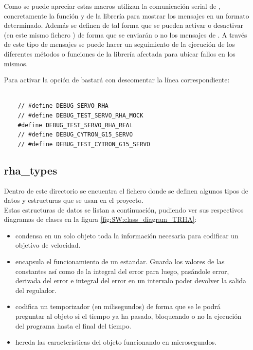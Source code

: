         Como se puede apreciar estas macros utilizan la comunicación serial de , concretamente la función  y  de la librería  para mostrar los mensajes en un formato determinado. Además se definen de tal forma que se pueden activar o desactivar (en este mismo fichero ) de forma que se enviarán o no los mensajes de . A través de este tipo de mensajes se puede hacer un seguimiento de la ejecución de los diferentes métodos o funciones de la librería afectada para ubicar fallos en los mismos.

        Para activar la opción de  bastará con descomentar la línea correspondiente:

        \lstset{language=C, breaklines=true, basicstyle=\footnotesize}
        \begin{lstlisting}[frame=single]

    // #define DEBUG_SERVO_RHA
    // #define DEBUG_TEST_SERVO_RHA_MOCK
    #define DEBUG_TEST_SERVO_RHA_REAL
    // #define DEBUG_CYTRON_G15_SERVO
    // #define DEBUG_TEST_CYTRON_G15_SERVO

        \end{lstlisting}

    \subsection{rha\_types} \label{subsec:SW:lib:rha_types}
        Dentro de este directorio se encuentra el fichero  donde se definen algunos tipos de datos y estructuras que se usan en el proyecto.
        \\

        Estas estructuras de datos se listan a continuación, pudiendo ver sus respectivos diagramas de clases en la figura \ref{fig:SW:class_diagram_TRHA}:

        \begin{itemize}
            \item {} condensa en un solo objeto toda la información necesaria para codificar un objetivo de velocidad.
            \item {} encapsula el funcionamiento de un  estandar. Guarda los valores de las constantes así como de la integral del error para luego, pasándole error, derivada del error e integral del error en un intervalo poder devolver la salida del regulador.
            \item {} codifica un temporizador (en milisegundos) de forma que se le podrá preguntar al objeto si el tiempo ya ha pasado, bloqueando o no la ejecución del programa hasta el final del tiempo.
            \item {} hereda las características del objeto  funcionando en microsegundos.

        \end{itemize}

